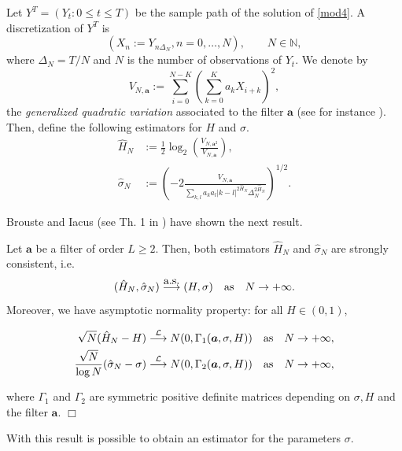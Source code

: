 \documentclass[smallextended]{svjour3}
\newcommand{\IN}{{\mathbb N}}
\begin{document}
Let $Y^T=(Y_t: 0\le t\le T)$ be  the sample path of the solution of
\eqref{mod4}. A discretization of $Y^T$ is
\[
(X_n:=Y_{n\Delta_N}, n=0,\ldots,N),\qquad
N\in \IN,
\]
where $\Delta_N=T/N$ and $N$ is the number of observations of $Y_t$. We denote
by
\begin{equation*}
V_{N,\bm{a}}:= \sum_{i=0}^{N-K}\left( \sum_{k=0}^K a_k X_{i+k} \right)^2,
\end{equation*}
the {\it generalized quadratic variation} associated to the filter $\bm{a}$
(see for instance \cite{is-la}). Then, define the
following estimators for $H$ and $\sigma$.
\begin{align}
\hat{H}_N&:=\tfrac{1}{2}\log_2\left(\frac{V_{N,\bm{a}^2}}{V_{N,\bm{a}}
}\right),\label{est1}\\
\hat{\sigma}_N&:=\left(-2\frac{V_{N,\bm{a}} }{\sum_{k,l} a_ka_l |k-l|^{2
\hat{H}_N } \Delta_N^{2 \hat{H}_N } }\right)^{1/2}.\label{est2}
\end{align}

Brouste and Iacus (see Th. 1 in \cite{br-ia}) have shown the next result.
\begin{theorem}
    Let  $\bm{a}$ be a filter of order $L \ge 2$. Then, both estimators
    $\hat{H}_N$ and $\hat{\sigma}_N$  are
    strongly consistent, i.e.
    \[
    ( \hat{H}_N,\hat{\sigma}_N) \stackrel{\hbox{\rm a.s.}}{\longrightarrow}
    (H,\sigma) \quad \hbox{\rm as}\quad N \rightarrow+\infty.
    \]
    Moreover, we have asymptotic normality property:  for all $H \in (0, 1)$,

    \begin{align*}
    \sqrt{N} (\hat{H}_N  - H ) &\stackrel{\mathcal{L}}{\longrightarrow} N (0,
    \Gamma_1 ( \bm{a},\sigma,H)) \quad  \hbox{\rm as} \quad N
    \rightarrow +\infty,\\
    \frac{\sqrt{N}}{\log N} ( \hat{\sigma}_N  - \sigma )
    &\stackrel{\mathcal{L}}{\longrightarrow} N (0, \Gamma_2 (\bm{a},\sigma,H))
    \quad
    \hbox{\rm as} \quad N \rightarrow +\infty,
    \end{align*}

    where $\Gamma_1$ and $\Gamma_2$ are symmetric positive definite matrices
    depending on $\sigma, H$ and the filter $\bm{a}$.
    \hfill$\Box$
\end{theorem}

With this result is possible to obtain an estimator for the parameters
$\sigma$.\\
\end{document}
